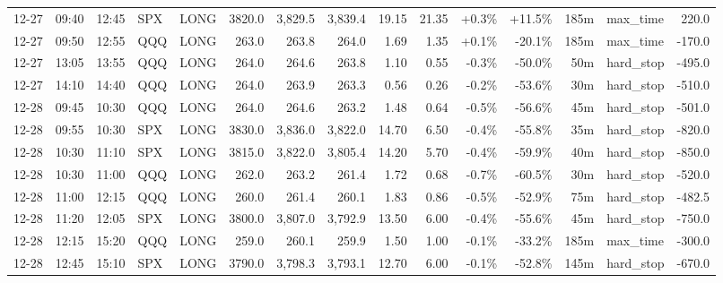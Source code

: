 \documentclass[11pt,a4paper,twoside]{article}
\begin{document}
\begin{landscape}
\begin{center}
\begin{longtable}{>{\color{txtmain}}l l l l l r r r r r r r r >{\color{txtmain}}l r}
12-27 & 09:40 & 12:45 & SPX & LONG & 3820.0 & 3,829.5 & 3,839.4 & 19.15 & 21.35 & \textcolor{wingreen}{+0.3\%} & \textcolor{wingreen}{+11.5\%} & 185m & max\_time & \textcolor{wingreen}{220.0} \\
12-27 & 09:50 & 12:55 & QQQ & LONG & 263.0 & 263.8 & 264.0 & 1.69 & 1.35 & \textcolor{wingreen}{+0.1\%} & \textcolor{lossred}{-20.1\%} & 185m & max\_time & \textcolor{lossred}{-170.0} \\
12-27 & 13:05 & 13:55 & QQQ & LONG & 264.0 & 264.6 & 263.8 & 1.10 & 0.55 & \textcolor{lossred}{-0.3\%} & \textcolor{lossred}{-50.0\%} & 50m & hard\_stop & \textcolor{lossred}{-495.0} \\
12-27 & 14:10 & 14:40 & QQQ & LONG & 264.0 & 263.9 & 263.3 & 0.56 & 0.26 & \textcolor{lossred}{-0.2\%} & \textcolor{lossred}{-53.6\%} & 30m & hard\_stop & \textcolor{lossred}{-510.0} \\
12-28 & 09:45 & 10:30 & QQQ & LONG & 264.0 & 264.6 & 263.2 & 1.48 & 0.64 & \textcolor{lossred}{-0.5\%} & \textcolor{lossred}{-56.6\%} & 45m & hard\_stop & \textcolor{lossred}{-501.0} \\
12-28 & 09:55 & 10:30 & SPX & LONG & 3830.0 & 3,836.0 & 3,822.0 & 14.70 & 6.50 & \textcolor{lossred}{-0.4\%} & \textcolor{lossred}{-55.8\%} & 35m & hard\_stop & \textcolor{lossred}{-820.0} \\
12-28 & 10:30 & 11:10 & SPX & LONG & 3815.0 & 3,822.0 & 3,805.4 & 14.20 & 5.70 & \textcolor{lossred}{-0.4\%} & \textcolor{lossred}{-59.9\%} & 40m & hard\_stop & \textcolor{lossred}{-850.0} \\
12-28 & 10:30 & 11:00 & QQQ & LONG & 262.0 & 263.2 & 261.4 & 1.72 & 0.68 & \textcolor{lossred}{-0.7\%} & \textcolor{lossred}{-60.5\%} & 30m & hard\_stop & \textcolor{lossred}{-520.0} \\
12-28 & 11:00 & 12:15 & QQQ & LONG & 260.0 & 261.4 & 260.1 & 1.83 & 0.86 & \textcolor{lossred}{-0.5\%} & \textcolor{lossred}{-52.9\%} & 75m & hard\_stop & \textcolor{lossred}{-482.5} \\
12-28 & 11:20 & 12:05 & SPX & LONG & 3800.0 & 3,807.0 & 3,792.9 & 13.50 & 6.00 & \textcolor{lossred}{-0.4\%} & \textcolor{lossred}{-55.6\%} & 45m & hard\_stop & \textcolor{lossred}{-750.0} \\
12-28 & 12:15 & 15:20 & QQQ & LONG & 259.0 & 260.1 & 259.9 & 1.50 & 1.00 & \textcolor{lossred}{-0.1\%} & \textcolor{lossred}{-33.2\%} & 185m & max\_time & \textcolor{lossred}{-300.0} \\
12-28 & 12:45 & 15:10 & SPX & LONG & 3790.0 & 3,798.3 & 3,793.1 & 12.70 & 6.00 & \textcolor{lossred}{-0.1\%} & \textcolor{lossred}{-52.8\%} & 145m & hard\_stop & \textcolor{lossred}{-670.0} \\

\end{longtable}
\end{center}
\end{landscape}
\end{document}
